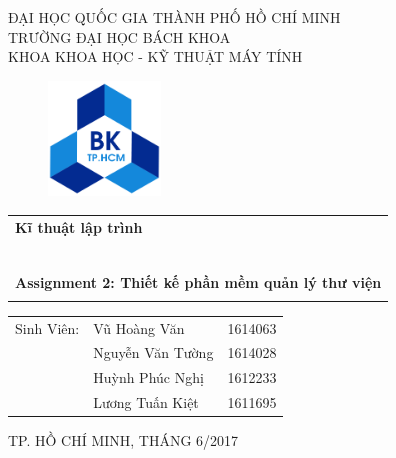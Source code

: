 \documentclass[a4paper]{article}
\begin{document}
\thispagestyle{empty}
\thisfancypage{
\setlength{\fboxsep}{10pt}
\fbox}{} 
\begin{titlepage}
\begin{center}
ĐẠI HỌC QUỐC GIA THÀNH PHỐ HỒ CHÍ MINH \\
TRƯỜNG ĐẠI HỌC BÁCH KHOA \\
KHOA KHOA HỌC - KỸ THUẬT MÁY TÍNH 
\end{center}

\vspace{1cm}

\begin{figure}[h!]
\begin{center}
\includegraphics[width=3cm]{hcmut.png}
\end{center}
\end{figure}

\vspace{1cm}


\begin{center}
\begin{tabular}{l}
\multicolumn{1}{l}{\textbf{{\Large Kĩ thuật lập trình}}}\\
~~\\
\hline
\\
\multicolumn{1}{l}{\textbf{{\Large Assignment 2:  Thiết kế phần  mềm quản lý thư viện}}}\\
\\
\hline
\end{tabular}
\end{center}
\vspace{1cm}
\begin{center}
\vspace{1cm}
\end{center}
\begin{center}
\begin{tabular}{rlc}
Sinh Viên: &Vũ Hoàng Văn  \hspace{1cm}     & 1614063 \\
&Nguyễn Văn Tường	&1614028\\
&Huỳnh Phúc Nghị	&1612233\\
&Lương Tuấn Kiệt & 1611695\\

\end{tabular}
\end{center}
\vspace{3.2cm}
\begin{center}
{\footnotesize TP. HỒ CHÍ MINH, THÁNG 6/2017}
\end{center}
\end{titlepage}
\newpage
\thispagestyle{empty}
\tableofcontents
\end{document}
